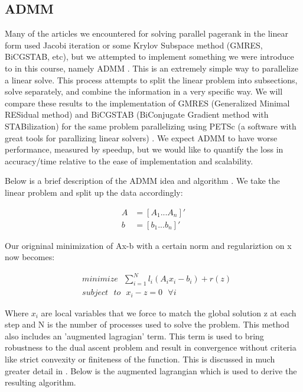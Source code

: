 \documentclass[letterpaper,11pt,onecolumn]{article}
\begin{document}
\subsection{ADMM}

Many of the articles we encountered for solving parallel pagerank in the linear form used Jacobi iteration or some Krylov Subspace method (GMRES, BiCGSTAB, etc), but we attempted to implement something we were introduce to in this course, namely ADMM \cite{ADMM}. This is an extremely simple way to parallelize a linear solve. This process attempts to split the linear problem into subsections, solve separately, and combine the information in a very specific way. 
We will compare these results to the implementation of GMRES (Generalized Minimal RESidual method) and BiCGSTAB (BiConjugate Gradient method with STABilization) for the same problem parallelizing using PETSc (a software with great tools for parallizing linear solvers) \cite{Power Law Graphs}. We expect ADMM to have worse performance, measured by speedup, but we would like to quantify the loss in accuracy/time relative to the ease of implementation and scalability.


Below is a brief description of the ADMM idea and algorithm \cite{ADMM}. We take the linear problem and split up the data accordingly:
\begin{center}
\begin{align}
	A &= \left[ A_{1} ... A_{n} \right]' \\
	b &= \left[ b_{1} ... b_{n} \right]' 
\end{align}
\end{center}

\noindent Our origninal minimization of Ax-b with a certain norm and regulariztion on x now becomes:

\begin{center}
\begin{align}
	&minimize \: \: \: \sum_{i=1}^{N} l_{i}(A_{i}x_{i} - b_{i}) + r(z) \\
	&subject \: \: \: to \: \: \: x_{i} - z = 0 \: \: \: \forall i
\end{align}
\end{center}

Where $x_{i}$ are local variables that we force to match the global solution z at each step and N is the number of processes used to solve the problem. This method also includes an 'augmented lagragian' term. This term is used to bring robustness to the dual ascent problem and result in convergence without criteria like strict convexity or finiteness of the function. This is discussed in much greater detail in \cite{ADMM}. Below is the augmented lagrangian which is used to derive the resulting algorithm.
\end{document}
